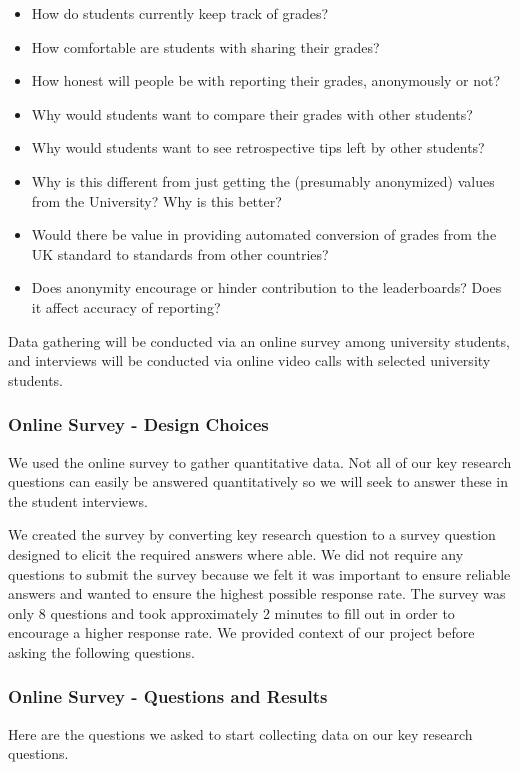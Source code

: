 \begin{itemize}
    \item How do students currently keep track of grades?
    \item How comfortable are students with sharing their grades?
    \item How honest will people be with reporting their grades, anonymously or not?
    \item Why would students want to compare their grades with other students?
    \item Why would students want to see retrospective tips left by other students?
    \item Why is this different from just getting the (presumably anonymized) values from the University? Why is this better?
    \item Would there be value in providing automated conversion of grades from the UK standard to standards from other countries?
    \item Does anonymity encourage or hinder contribution to the leaderboards? Does it affect accuracy of reporting?
\end{itemize}

Data gathering will be conducted via an online survey among university students, and interviews will be conducted via online video calls with selected university students.

\subsubsection{Online Survey - Design Choices}
We used the online survey to gather quantitative data. Not all of our key research questions can easily be answered quantitatively so we will seek to answer these in the student interviews.

We created the survey by converting key research question to a survey question designed to elicit the required answers where able. We did not require any questions to submit the survey because we felt it was important to ensure reliable answers and wanted to ensure the highest possible response rate. The survey was only 8 questions and took approximately 2 minutes to fill out in order to encourage a higher response rate. We provided context of our project before asking the following questions.

\subsubsection{Online Survey - Questions and Results}
Here are the questions we asked to start collecting data on our key research questions.

